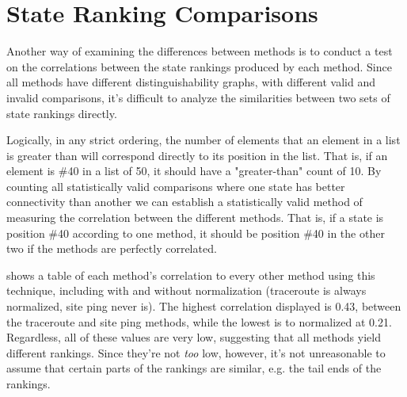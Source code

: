 \section{State Ranking Comparisons}\label{sec:comparative-correlations}

Another way of examining the differences between methods is to conduct a test on the correlations between the state rankings produced by each method. Since all methods have different distinguishability graphs, with different valid and invalid comparisons, it's difficult to analyze the similarities between two sets of state rankings directly.

Logically, in any strict ordering, the number of elements that an element in a list is greater than will correspond directly to its position in the list. That is, if an element is \#40 in a list of 50, it should have a "greater-than" count of 10. By counting all statistically valid comparisons where one state has better connectivity than another we can establish a statistically valid method of measuring the correlation between the different methods. That is, if a state is position \#40 according to one method, it should be position \#40 in the other two if the methods are perfectly correlated.



 shows a table of each method's correlation to every other method using this technique, including \dns with and without normalization (traceroute is always normalized, site ping never is). The highest correlation displayed is 0.43, between the traceroute and site ping methods, while the lowest is \dns to normalized \dns at 0.21. Regardless, all of these values are very low, suggesting that all methods yield different rankings. Since they're not \textit{too} low, however, it's not unreasonable to assume that certain parts of the rankings are similar, e.g. the tail ends of the rankings.

